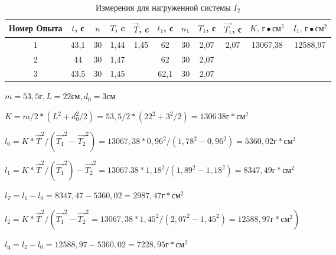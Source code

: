 \begin{table}[ht]
    \centering
    
    \begin{tabular}{|c|c|c|c|c|c|c|c|c|c|c|}
        \hline
        Номер Опыта & $t$, с & $n$ & $T$, c &     $\vec{T}$, c      & $t_1$, с & $n_1$ & $T_1$, с & $\vec{T_1}$, с         & $K \text{, г}\bullet\text{см}^2$ & $I_1\text{, г}\bullet\text{см}^2$ \\
        \hline
                  1 &  43,1  & 30  &  1,44  & \multirow{3}{*}{1,45} &   62     &  30   &  2,07     & \multirow{3}{*}{2,07}  &     \multirow{3}{*}{13067,38 }   & \multirow{3}{*}{12588,97}         \\
        \hline
                  2 &  44    & 30  &  1,47  &                       &   62     &  30   &  2,07     &                        &                                  &                                   \\
        \hline
                  3 &  43,5  & 30  &  1,45  &                       &   62,1   &  30   &  2,07     &                        &                                  &                                   \\
        \hline
    \end{tabular}

    \caption{Измерения для нагруженной системы $I_2$} \label{table-3}
\end{table}

%

$m = 53,5 \text{г}, L = 22 \text{см}, d_0 = 3 \text{см}$

$K = m / 2 \ast (L^2 + d_0^2 / 2) = 
53,5 / 2 \ast (22^2 + 3^2 / 2) = 1306\,38 \text{г} \ast \text{см}^2$

$l_0 = K \ast \vec{T}^2 / (\vec{T_1}^2 - \vec{T_2}^2) =
13067,38 \ast 0,96^2 / (1,78^2 - 0,96^2) = 5360,02 \text{г} \ast \text{см}^2$

$l_1 = K \ast \vec{T}^2 / (\vec{T_1}^2) - \vec{T_2}^2 =
13067.38 \ast 1,18^2 / (1,89^2 - 1,18 ^2) =8347,49 \text{г} \ast \text{см}^2$

$l_T = l_1 - l_0 = 8347,47 - 5360,02 = 2987,47 \text{г} \ast \text{см}^2$

$l_2 = K \ast \vec{T}^2 / (\vec{T_1}^2 - \vec{T_2}^2 =
13067,38 \ast 1,45^2 / (2,07^2 - 1,45 ^2) = 12588,97 \text{г} \ast \text{см}^2)$

$l_{\text{ц}} = l_2 - l_0 = 12588,97 - 5360,02 = 7228,95 \text{г} \ast \text{см}^2$

